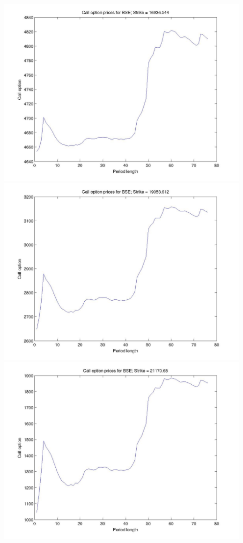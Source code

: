 \documentclass[12pt]{article}
\begin{document}
\begin{center}
      \includegraphics[width=5in]{put_strike4.jpg}
      \includegraphics[width=5in]{put_strike5.jpg}
      \includegraphics[width=5in]{put_strike6.jpg}

\end{center}
\end{document}
